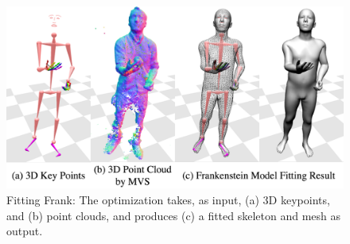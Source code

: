 \begin{figure}[t]	
	\includegraphics[width=\columnwidth]{tbc_figures/3Dmeasurements_legend2}
	\caption{Fitting Frank: The optimization takes, as input, (a) 3D keypoints, and (b) point clouds, and produces (c) a fitted skeleton and mesh as output.}
	\label{fig:3dlandmarks_model_fitting}
\end{figure}

%	
%

